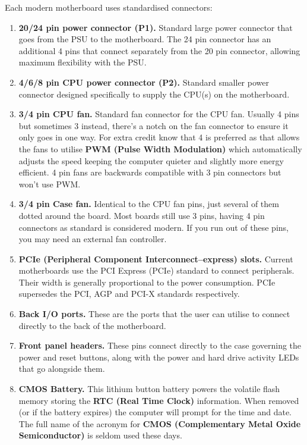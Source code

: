 \documentclass{article}
\begin{document}
Each modern motherboard uses standardised connectors:
\begin{enumerate}

\item \textbf{20/24 pin power connector (P1).} Standard large power connector that goes from the PSU to the motherboard. The 24 pin connector has an additional 4 pins that connect separately from the 20 pin connector, allowing maximum flexibility with the PSU.

\item \textbf{4/6/8 pin CPU power connector (P2).} Standard smaller power connector designed specifically to supply the CPU(s) on the motherboard.

\item \textbf{3/4 pin CPU fan.} Standard fan connector for the CPU fan. Usually 4 pins but sometimes 3 instead, there's a notch on the fan connector to ensure it only goes in one way. For extra credit know that 4 is preferred as that allows the fans to utilise \textbf{PWM (Pulse Width Modulation)} which automatically adjusts the speed keeping the computer quieter and slightly more energy efficient. 4 pin fans are backwards compatible with 3 pin connectors but won't use PWM.

\item \textbf{3/4 pin Case fan.} Identical to the CPU fan pins, just several of them dotted around the board. Most boards still use 3 pins, having 4 pin connectors as standard is considered modern. If you run out of these pins, you may need an external fan controller.

\item \textbf{PCIe (Peripheral Component Interconnect--express) slots.} Current motherboards use the PCI Express (PCIe) standard to connect peripherals. Their width is generally proportional to the power consumption. PCIe supersedes the PCI, AGP and PCI-X standards respectively.

\item \textbf{Back I/O ports.} These are the ports that the user can utilise to connect directly to the back of the motherboard.

\item \textbf{Front panel headers.} These pins connect directly to the case governing the power and reset buttons, along with the power and hard drive activity LEDs that go alongside them.

\item \textbf{CMOS Battery.} This lithium button battery powers the volatile flash memory storing the \textbf{RTC (Real Time Clock)} information. When removed (or if the battery expires) the computer will prompt for the time and date. The full name of the acronym for \textbf{CMOS (Complementary Metal Oxide Semiconductor)} is seldom used these days.


\end{enumerate}
\end{document}
